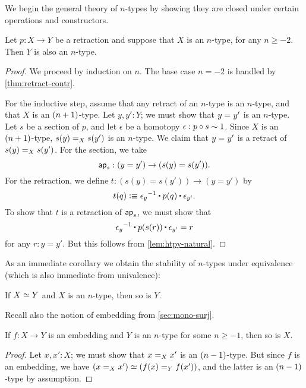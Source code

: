 We begin the general theory of $n$-types by showing they are closed under certain operations and constructors.

\begin{thm}\label{thm:h-level-retracts}
 Let $p : X \to Y$ be a retraction and suppose that $X$ is an $n$-type, for any $n\geq -2$.
 Then $Y$ is also an $n$-type.
\end{thm}

\begin{proof}
 We proceed by induction on $n$.
 The base case $n=-2$ is handled by \autoref{thm:retract-contr}.

 For the inductive step, assume that any retract of an $n$-type is an $n$-type, and that $X$ is an $\nplusone$-type.
 Let $y, y' : Y$; we must show that $\id{y}{y'}$ is an $n$-type.
 Let $s$ be a section of $p$, and let $\epsilon$ be a homotopy $\epsilon : p \circ s \htpy 1$.
 Since $X$ is an $\nplusone$-type, $\id[X]{s(y)}{s(y')}$ is an $n$-type.
 We claim that $\id{y}{y'}$ is a retract of $\id[X]{s(y)}{s(y')}$.
 For the section, we take
 \[ \apfunc s : (y=y') \to (s(y)=s(y')). \]
 For the retraction, we define $t:(s(y)=s(y'))\to(y=y')$ by
 \[ t(q) \defeq  \opp{\epsilon_y} \ct \ap p q \ct \epsilon_{y'}.\]
 To show that $t$ is a retraction of $\apfunc s$, we must show that
 \[ \opp{\epsilon_y} \ct \ap p {\ap sr} \ct \epsilon_{y'} = r \]
 for any $r:y=y'$.
 But this follows from \autoref{lem:htpy-natural}.
\end{proof}

As an immediate corollary we obtain the stability of $n$-types under equivalence (which is also immediate from univalence):

\begin{cor}\label{cor:preservation-hlevels-weq}
 If $\eqv{X}{Y}$ and $X$ is an $n$-type, then so is $Y$.
\end{cor}

Recall also the notion of embedding from \autoref{sec:mono-surj}.

\begin{thm}\label{thm:isntype-mono}
  If $f:X\to Y$ is an embedding and $Y$ is an $n$-type for some $n\ge -1$, then so is $X$.
\end{thm}
\begin{proof}
  Let $x,x':X$; we must show that $\id[X]{x}{x'}$ is an $\nminusone$-type.
  But since $f$ is an embedding, we have $(\id[X]{x}{x'}) \eqvsym (\id[Y]{f(x)}{f(x')})$, and the latter is an $\nminusone$-type by assumption.
\end{proof}

